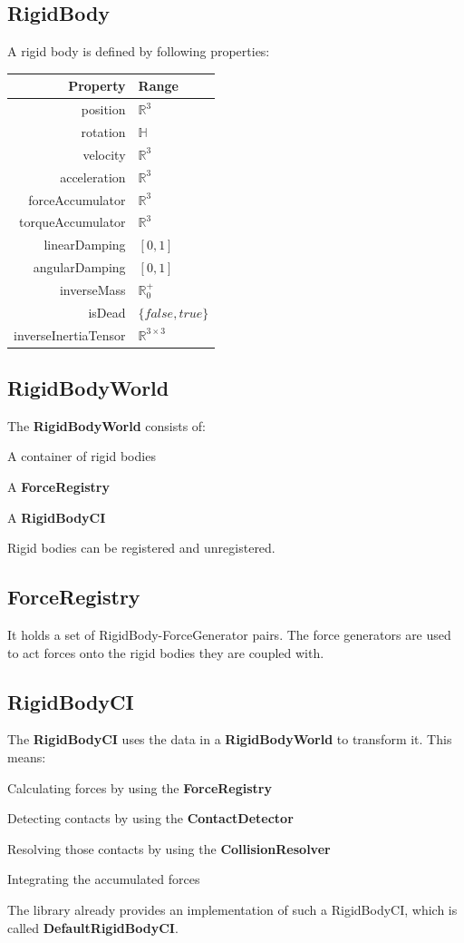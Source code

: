 \documentclass[12p, paper=a4, leqno, colorinlistoftodos]{article}
\newenvironment{packed_itemize}
{\begin{itemize}
		\setlength{\itemsep}{0pt}
		\setlength{\parskip}{0pt}
		\setlength{\parsep}{0pt}
	}{\end{itemize}}
\begin{document}
		\subsection{RigidBody}
		A rigid body is defined by following properties:
		
		\begin{tabular}[H]{r | l}
			Property & Range\\
			\hline
			position & $\mathbb{R}^3$\\
			rotation & $\mathbb{H}$\\
			velocity & $\mathbb{R}^3$\\
			acceleration & $\mathbb{R}^3$\\
			forceAccumulator & $\mathbb{R}^3$\\
			torqueAccumulator & $\mathbb{R}^3$\\
			linearDamping & $[0, 1]$\\
			angularDamping & $[0, 1]$\\
			inverseMass & $\mathbb{R}^+_0$\\
			isDead & $\{false, true\}$\\
			inverseInertiaTensor & $\mathbb{R}^{3 \times 3}$\\
		\end{tabular}
	
		\subsection{RigidBodyWorld}
		The \textbf{RigidBodyWorld} consists of:
		\begin{packed_itemize}
			\item A container of rigid bodies
			\item A \textbf{ForceRegistry}
			\item A \textbf{RigidBodyCI}
		\end{packed_itemize}
		Rigid bodies can be registered and unregistered.
		
		\subsection{ForceRegistry}
		It holds a set of RigidBody-ForceGenerator pairs. The force generators are used to act forces onto the rigid bodies they are coupled with.
		
		\subsection{RigidBodyCI}
		The \textbf{RigidBodyCI} uses the data in a \textbf{RigidBodyWorld} to transform it. This means:
		\begin{packed_itemize}
			\item Calculating forces by using the \textbf{ForceRegistry}
			\item Detecting contacts by using the \textbf{ContactDetector}
			\item Resolving those contacts by using the \textbf{CollisionResolver}
			\item Integrating the accumulated forces
		\end{packed_itemize}
		The library already provides an implementation of such a RigidBodyCI, which is called \textbf{DefaultRigidBodyCI}.
		
\end{document}
